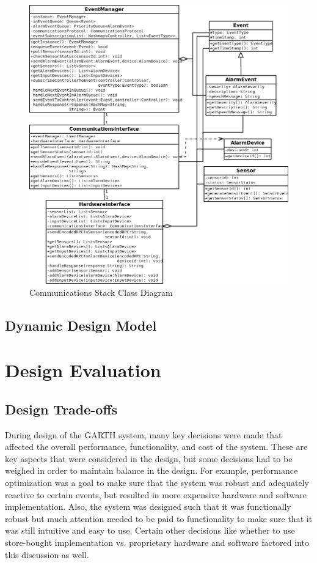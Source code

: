 \documentclass{report}
\begin{document}
\begin{figure}[p]
  \centering
  \caption{Communications Stack Class Diagram}
  \label{fig:communications_stack_class_diagram}
  \includegraphics[scale=0.5]{communication_stack_class_diagram}
\end{figure}

\section{Dynamic Design Model}

\chapter{Design Evaluation} %
\label{ch:design-evaluation}

\section{Design Trade-offs}

During design of the GARTH system, many key decisions were made that affected
the overall performance, functionality, and cost of the system. These are key
aspects that were considered in the design, but some decisions had to be
weighed in order to maintain balance in the design. For example, performance
optimization was a goal to make sure that the system was robust and adequately
reactive to certain events, but resulted in more expensive hardware and
software implementation. Also, the system was designed such that it was
functionally robust but much attention needed to be paid to functionality to
make sure that it was still intuitive and easy to use. Certain other decisions
like whether to use store-bought implementation vs. proprietary hardware and
software factored into this discussion as well.
\end{document}
